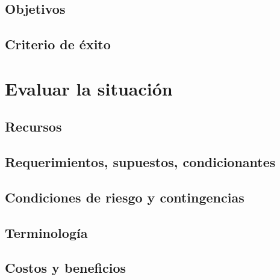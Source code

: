 \documentclass[11pt,a4paper]{tesis}
\begin{document}
\subsection{Objetivos}

\subsection{Criterio de éxito}

\section{Evaluar la situación}
\subsection{Recursos}

\subsection{Requerimientos, supuestos, condicionantes}

\subsection{Condiciones de riesgo y contingencias}

\subsection{Terminología}

\subsection{Costos y beneficios}

\end{document}
